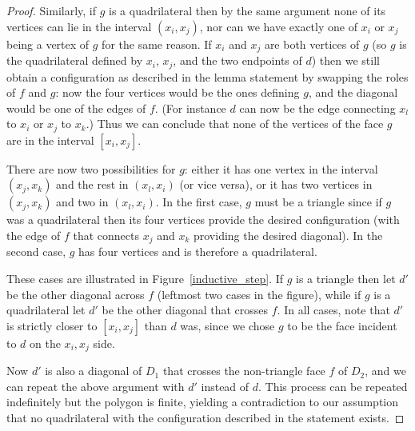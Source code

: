 \documentclass[11pt]{article}
\theoremstyle{remark}
\theoremstyle{definition}
\begin{document}
\begin{proof}
Similarly, if $g$ is a quadrilateral then by the same argument none of its vertices can lie in the interval $(x_i, x_j)$, nor can we have exactly one of $x_i$ or $x_j$ being a vertex of $g$ for the same reason. If $x_i$ and $x_j$ are both vertices of $g$ (so $g$ is the quadrilateral defined by $x_i$, $x_j$, and the two endpoints of $d$) then we still obtain a configuration as described in the lemma statement by swapping the roles of $f$ and $g$: now the four vertices would be the ones defining $g$, and the diagonal would be one of the edges of $f$. (For instance $d$ can now be the edge connecting $x_l$ to $x_i$ or $x_j$ to $x_k$.) Thus we can conclude that none of the vertices of the face $g$ are in the interval $[x_i, x_j]$.  

There are now two possibilities for $g$: either it has one vertex in the interval $(x_j, x_k)$ and the rest in $(x_l, x_i)$ (or vice versa), or it has two vertices in $(x_j, x_k)$ and two in $(x_l, x_i)$. In the first case, $g$ must be a triangle since if $g$ was a quadrilateral then its four vertices provide the desired configuration (with the edge of $f$ that connects $x_j$ and $x_k$ providing the desired diagonal). In the second case, $g$ has four vertices and is therefore a quadrilateral.

These cases are illustrated in Figure~\ref{inductive_step}. If $g$ is a triangle then let $d'$ be the other diagonal across $f$ (leftmost two cases in the figure), while if $g$ is a quadrilateral let $d'$ be the other diagonal that crosses $f$. In all cases, note that $d'$ is strictly closer to $[x_i,x_j]$ than $d$ was, since we chose $g$ to be the face incident to $d$ on the $x_i,x_j$ side.

Now $d'$ is also a diagonal of $D_1$ that crosses the non-triangle face $f$ of $D_2$, and we can repeat the above argument with $d'$ instead of $d$. This process can be repeated indefinitely but the polygon is finite, yielding a contradiction to our assumption that no quadrilateral with the configuration described in the statement exists.
\end{proof}
\end{document}
